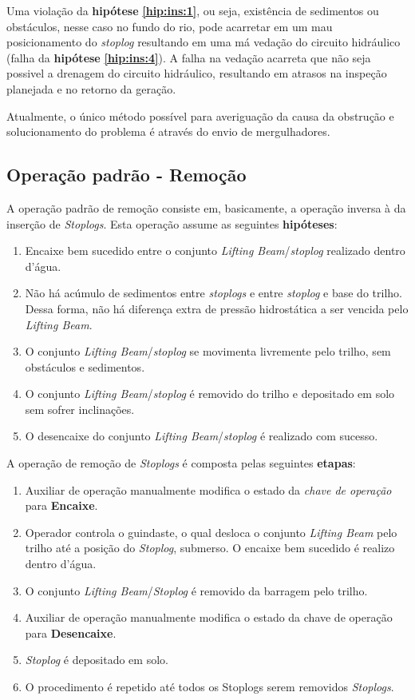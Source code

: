 Uma violação da \textbf{hipótese} \textbf{\ref{hip:ins:1}}, ou seja, existência
de sedimentos ou obstáculos, nesse caso no fundo do rio, pode acarretar em um mau posicionamento do
\emph{stoplog} resultando em uma má vedação do circuito hidráulico (falha da \textbf{hipótese} \textbf{\ref{hip:ins:4}}).  A falha na vedação acarreta que não seja possivel a drenagem do circuito hidráulico, resultando em atrasos na inspeção planejada e no retorno da geração. 

Atualmente, o único método possível para averiguação da causa da obstrução e solucionamento do problema é através do envio de mergulhadores.  




\subsection{Operação padrão - Remoção}
A operação padrão de remoção consiste em, basicamente, a operação inversa à da inserção de \emph{Stoplogs}. Esta operação assume as seguintes \textbf{hipóteses}:

\begin{enumerate}
\item Encaixe bem sucedido entre o conjunto \emph{Lifting Beam}/\emph{stoplog}
realizado dentro d'água.
\item Não há acúmulo de sedimentos entre \emph{stoplogs} e entre \emph{stoplog} e base do trilho. Dessa forma, não há diferença extra de pressão hidrostática a ser vencida pelo \emph{Lifting Beam}.
\label{hip:rem:2}
\item O conjunto \emph{Lifting Beam}/\emph{stoplog} se movimenta livremente pelo trilho, sem obstáculos e sedimentos.
\item O conjunto \emph{Lifting Beam}/\emph{stoplog} é removido do trilho e depositado em solo sem sofrer inclinações.  
\item O desencaixe do conjunto \emph{Lifting Beam}/\emph{stoplog} é realizado com sucesso.
\end{enumerate}

A operação de remoção de \emph{Stoplogs} é composta pelas seguintes \textbf{etapas}:
\begin{enumerate}
\item Auxiliar de operação manualmente modifica o estado da \emph{chave de operação} para \textbf{Encaixe}.
\item Operador controla o guindaste, o qual desloca o conjunto \emph{Lifting Beam} pelo trilho até a posição do \emph{Stoplog}, submerso. O encaixe bem sucedido é realizo dentro d'água.
\item O conjunto \emph{Lifting Beam}/\emph{Stoplog} é removido da barragem pelo trilho. 
\item Auxiliar de operação manualmente modifica o estado da chave de operação para \textbf{Desencaixe}.
\item \emph{Stoplog} é depositado em solo.
\item O procedimento é repetido até todos os Stoplogs serem removidos \emph{Stoplogs}.
\end{enumerate}


